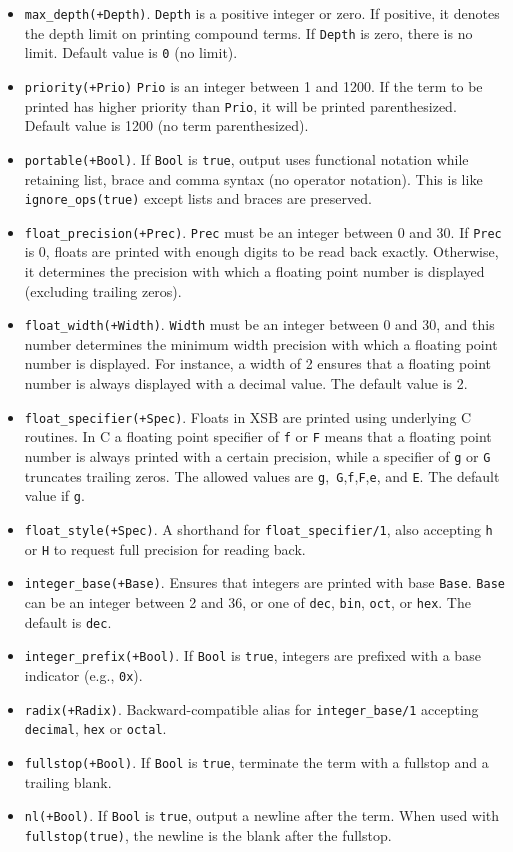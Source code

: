 \begin{description}
\begin{itemize}
{}
\item {\tt max\_depth(+Depth)}. {\tt Depth} is a positive integer or
zero. If positive, it denotes the depth limit on printing compound
terms. If {\tt Depth} is zero, there is no limit. Default value is
{\tt 0} (no limit).
%
\item {\tt priority(+Prio)} {\tt Prio} is an integer between 1 and
1200.  If the term to be printed has higher priority than {\tt Prio},
it will be printed parenthesized.  Default value is 1200 (no term
parenthesized).
%
\item {\tt portable(+Bool)}. If {\tt Bool} is {\tt true}, output uses
functional notation while retaining list, brace and comma syntax (no
operator notation).  This is like {\tt ignore\_ops(true)} except lists
and braces are preserved.
%
\item {\tt float\_precision(+Prec)}.  {\tt Prec} must be an integer
  between 0 and 30.  If {\tt Prec} is 0, floats are printed with enough
  digits to be read back exactly.  Otherwise, it determines the
  precision with which a floating point number is displayed (excluding
  trailing zeros).
%
\item {\tt float\_width(+Width)}.  {\tt Width} must be an integer
  between 0 and 30, and this number determines the minimum width
  precision with which a floating point number is displayed.  For
  instance, a width of 2 ensures that a floating point number is
  always displayed with a decimal value.  The default value is 2.
%
\item {\tt float\_specifier(+Spec)}.  Floats in XSB are printed using
  underlying C routines.  In C a floating point specifier of {\tt f}
  or {\tt F} means that a floating point number is always printed with
  a certain precision, while a specifier of {\tt g} or {\tt G}
  truncates trailing zeros.  The allowed values are {\tt g},{\tt
    G},{\tt f},{\tt F},{\tt e}, and {\tt E}.  The default value if {\tt g}.
%
\item {\tt float\_style(+Spec)}.  A shorthand for {\tt float\_specifier/1},
  also accepting {\tt h} or {\tt H} to request full precision for reading
  back.
%
\item {\tt integer\_base(+Base)}.  Ensures that integers are printed
  with base {\tt Base}.  {\tt Base} can be an integer between 2 and 36,
  or one of {\tt dec}, {\tt bin}, {\tt oct}, or {\tt hex}.  The default
  is {\tt dec}.
%
\item {\tt integer\_prefix(+Bool)}.  If {\tt Bool} is {\tt true},
  integers are prefixed with a base indicator (e.g., {\tt 0x}).
%
\item {\tt radix(+Radix)}.  Backward-compatible alias for
  {\tt integer\_base/1} accepting {\tt decimal}, {\tt hex} or {\tt octal}.
%
\item {\tt fullstop(+Bool)}.  If {\tt Bool} is {\tt true}, terminate
  the term with a fullstop and a trailing blank.
%
\item {\tt nl(+Bool)}.  If {\tt Bool} is {\tt true}, output a newline
  after the term.  When used with {\tt fullstop(true)}, the newline is
  the blank after the fullstop.
%
\end{itemize}


\end{description}
